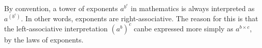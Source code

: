 \documentclass{article}
\begin{document}
    By convention, a tower of exponents $a^{b^c}$ in mathematics is always interpreted as $a^{(b^c)}$. In other words, exponents are right-associative. The reason for this is that the left-associative interpretation $(a^b)^c$ canbe expressed more simply as $a^{b \times c}$, by the laws of exponents.
    
\end{document}
